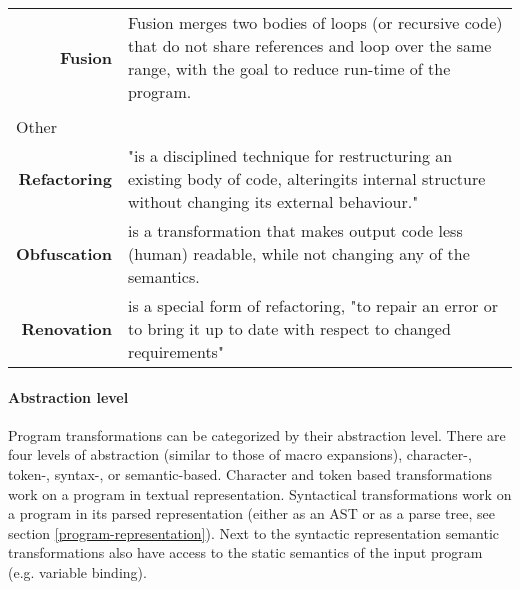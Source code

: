 \begin{table}[h]
\begin{tabular}{p{0.2\linewidth}p{0.8\linewidth}}
\multicolumn{1}{r}{\bf Fusion}                      & Fusion merges two bodies of loops (or recursive code) that do not share references and loop over the same range, with the goal to reduce run-time of the program.                                                                                                                                                                               \\
\\
\multicolumn{1}{l}{Other}         &                                                                                                                                                                               \\
\multicolumn{1}{r}{\bf Refactoring}                 & "is a disciplined technique for restructuring an existing body of code, alteringits internal structure without changing its external behaviour."\footnotemark                 \\
\multicolumn{1}{r}{\bf Obfuscation}                 & is a transformation that makes output code less (human) readable, while not changing any of the semantics.                                                                    \\
\multicolumn{1}{r}{\bf Renovation}                  & is a special form of refactoring, "to repair an error or to bring it up to date with respect to changed requirements"\cite{Visser2001}                                                
\end{tabular}
\end{table}

\paragraph{Abstraction level}
Program transformations can be categorized by their abstraction level. There are four levels of abstraction (similar to those of macro expansions\cite{Weise1993}), character-, token-, syntax-, or semantic-based. Character and token based transformations work on a program in textual representation. Syntactical transformations work on a program in its parsed representation (either as an AST or as a parse tree, see section \ref{program-representation}). Next to the syntactic representation semantic transformations also have access to the static semantics of the input program (e.g. variable binding).

